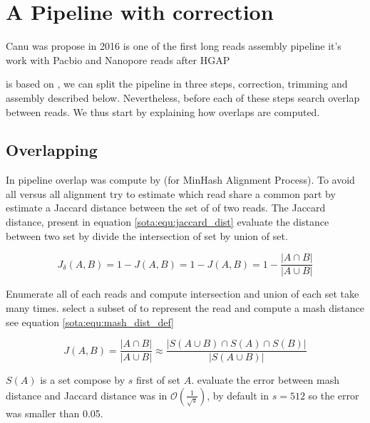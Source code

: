 \documentclass[main]{subfiles}
\begin{document}
\section{A Pipeline with correction \canu} \label{section:sota:canu}

Canu \cite{canu} was propose in 2016 is one of the first long reads assembly pipeline it's work with Pacbio and Nanopore reads after HGAP \cite{hgap}

\canu is based on  \cite{celera_first, celera_second}, we can split the \canu pipeline in three steps, correction, trimming and assembly described below. Nevertheless, before each of these steps \canu search overlap between reads. We thus start by explaining how overlaps are computed.

\subsection{Overlapping} \label{subsec:sota:canu:overlapping}

In \canu pipeline overlap was compute by \mhap (for MinHash Alignment Process). To avoid all versus all alignment \mhap try to estimate which read share a common part by estimate a Jaccard distance between the set of \kmers of two reads. The Jaccard distance, present in equation \ref{sota:equ:jaccard_dist} evaluate the distance between two set by divide the intersection of set by union of set.

\begin{equation}
J_{\delta}(A,B) = 1 - J(A,B) = 1 -  J(A,B) = 1 - \frac{|A \cap B|}{|A \cup B|}
\label{sota:equ:jaccard_dist}
\end{equation}

Enumerate all \kmers of each reads and compute intersection and union of each set take many times. \mhap select a subset of \kmers to represent the read and compute a mash distance \cite{mash_distance} see equation \ref{sota:equ:mash_dist_def} 

\begin{equation}
J(A,B) = \frac{|A \cap B|}{|A \cup B|} \approx \frac{|S(A \cup B) \cap S(A) \cap S(B)|}{|S(A \cup B)|}
\label{sota:equ:mash_dist_def}
\end{equation}

$S(A)$ is a \kmers set compose by $s$ first \kmers of set $A$. \citeauthor{mash_distance} evaluate the error between mash distance and Jaccard distance was in $\mathcal{O}(\frac{1}{\sqrt{s}})$, by default in \mhap $s=512$ so the error was smaller than 0.05.
\end{document}
